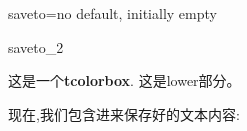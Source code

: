 \begin{docTcbKey}[][doc new=2015-05-04]{saveto}{=}{no default, initially empty}





\begin{exdispExample}{saveto_2}
\begin{tcolorbox}[saveto=\jobname_mysave2.tex]
这是一个\textbf{tcolorbox}.
\tcblower
这是lower部分。
\end{tcolorbox}

现在,我们包含进来保存好的文本内容:
\begin{tcolorbox}[colframe=red,colback=red!10,
coltitle=black,colbacktitle=red!20
,sidebyside%
,title=在这里我们看到保存的内容包括lower部分]

\end{tcolorbox}
\end{exdispExample}
\end{docTcbKey}


